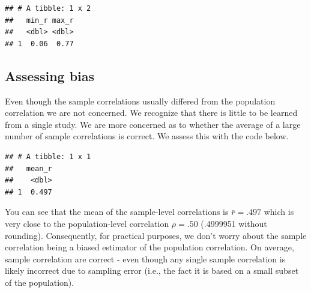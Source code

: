 \documentclass[
]{krantz}
\makeatletter
\newenvironment{Shaded}{\begin{snugshade}}{\end{snugshade}}
\newcommand{\DataTypeTok}[1]{\textcolor[rgb]{0.27,0.27,0.27}{#1}}
\newcommand{\KeywordTok}[1]{\textcolor[rgb]{0.27,0.27,0.27}{\textbf{#1}}}
\newcommand{\NormalTok}[1]{#1}
\newcommand{\OperatorTok}[1]{\textcolor[rgb]{0.43,0.43,0.43}{\textbf{#1}}}
\newcommand{\StringTok}[1]{\textcolor[rgb]{0.5,0.5,0.5}{#1}}
\newenvironment{kframe}{%
\medskip{}
\setlength{\fboxsep}{.8em}
 \def\at@end@of@kframe{}%
 \ifinner\ifhmode%
  \def\at@end@of@kframe{\end{minipage}}%
  \begin{minipage}{\columnwidth}%
 \fi\fi%
 \def\FrameCommand##1{\hskip\@totalleftmargin \hskip-\fboxsep
 \colorbox{shadecolor}{##1}\hskip-\fboxsep
     \hskip-\linewidth \hskip-\@totalleftmargin \hskip\columnwidth}%
 \MakeFramed {\advance\hsize-\width
   \@totalleftmargin\z@ \linewidth\hsize
   \@setminipage}}%
 {\par\unskip\endMakeFramed%
 \at@end@of@kframe}
\renewenvironment{Shaded}{\begin{kframe}}{\end{kframe}}
\makeatother
\begin{document}
\begin{Shaded}
\end{Shaded}

\begin{verbatim}
## # A tibble: 1 x 2
##   min_r max_r
##   <dbl> <dbl>
## 1  0.06  0.77
\end{verbatim}

\hypertarget{assessing-bias-3}{%
\subsection{Assessing bias}\label{assessing-bias-3}}

Even though the sample correlations usually differed from the population correlation we are not concerned. We recognize that there is little to be learned from a single study. We are more concerned as to whether the average of a large number of sample correlations is correct. We assess this with the code below.

\begin{Shaded}
\end{Shaded}

\begin{verbatim}
## # A tibble: 1 x 1
##   mean_r
##    <dbl>
## 1  0.497
\end{verbatim}

You can see that the mean of the sample-level correlations is \(\bar{r} = .497\) which is very close to the population-level correlation \(\rho = .50\) (.4999951 without rounding). Consequently, for practical purposes, we don't worry about the sample correlation being a biased estimator of the population correlation. On average, sample correlation are correct - even though any single sample correlation is likely incorrect due to sampling error (i.e., the fact it is based on a small subset of the population).
\end{document}

